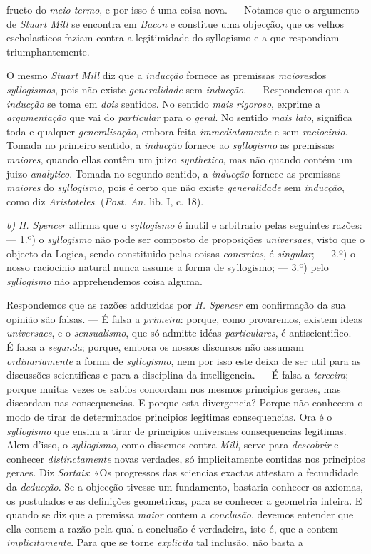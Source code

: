 fructo do \emph{meio termo}, e por isso é uma coisa nova. --- Notamos que o argumento de \emph{Stuart Mill} se encontra em \emph{Bacon} e constitue uma objecção, que os velhos escholasticos faziam contra a legitimidade do syllogismo e a que respondiam triumphantemente.\par O mesmo \emph{Stuart Mill} diz que a \emph{inducção} fornece as premissas \emph{maiores}dos \emph{syllogismos}, pois não existe \emph{generalidade} sem \emph{inducção}. --- Respondemos que a \emph{inducção} se toma em \emph{dois} sentidos. No sentido \emph{mais rigoroso}, exprime a \emph{argumentação} que vai do \emph{particular} para o \emph{geral}. No sentido \emph{mais lato}, significa toda e qualquer \emph{generalisação}, embora feita \emph{immediatamente} e sem \emph{raciocinio}. --- Tomada no primeiro sentido, a \emph{inducção} fornece ao \emph{syllogismo} as premissas \emph{maiores}, quando ellas contêm um juizo \emph{synthetico}, mas não quando contém um juizo \emph{analytico}. Tomada no segundo sentido, a \emph{inducção} fornece as premissas \emph{maiores} do \emph{syllogismo}, pois é certo que não existe \emph{generalidade} sem \emph{inducção}, como diz \emph{Aristoteles}. (\emph{Post. An.} lib. I, c. 18).\par \emph{b)} \emph{H. Spencer} affirma que o \emph{syllogismo} é inutil e arbitrario pelas seguintes razões: --- 1.º) o \emph{syllogismo} não pode ser composto de proposições \emph{universaes}, visto que o objecto da Logica, sendo constituido pelas coisas \emph{concretas}, é \emph{singular}; --- 2.º) o nosso raciocinio natural nunca assume a forma de syllogismo; --- 3.º) pelo \emph{syllogismo} não apprehendemos coisa alguma.\par Respondemos que as razões adduzidas por \emph{H. Spencer} em confirmação da sua opinião são falsas. --- É falsa a \emph{primeira}: porque, como provaremos, existem ideas \emph{universaes}, e o \emph{sensualismo}, que só admitte idéas \emph{particulares}, é antiscientifico. --- É falsa a \emph{segunda}; porque, embora os nossos discursos não assumam \emph{ordinariamente} a forma de \emph{syllogismo}, nem por isso este deixa de ser util para as discussões scientificas e para a disciplina da intelligencia. --- É falsa a \emph{terceira}; porque muitas vezes os sabios concordam nos mesmos principios geraes, mas discordam nas consequencias. E porque esta divergencia? Porque não conhecem o modo de tirar de determinados principios legitimas consequencias. Ora é o \emph{syllogismo} que ensina a tirar de principios universaes consequencias legitimas. Alem d'isso, o \emph{syllogismo}, como dissemos contra \emph{Mill}, serve para \emph{descobrir} e conhecer \emph{distinctamente} novas verdades, só implicitamente contidas nos principios geraes. Diz \emph{Sortais}: «Os progressos das sciencias exactas attestam a fecundidade da \emph{deducção}. Se a objecção tivesse um fundamento, bastaria conhecer os axiomas, os postulados e as definições geometricas, para se conhecer a geometria inteira. E quando se diz que a premissa \emph{maior} contem a \emph{conclusão}, devemos entender que ella contem a razão pela qual a conclusão é verdadeira, isto é, que a contem \emph{implicitamente}. Para que se torne \emph{explicita} tal inclusão, não basta a 